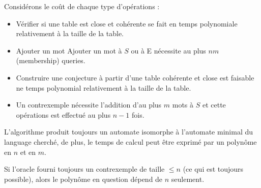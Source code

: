 Considérons le coût de chaque type d'opérations :
\begin{itemize}
	\item Vérifier si une table est close et cohérente se fait en temps polynomiale relativement à la taille de la table.
	\item Ajouter un mot  Ajouter un mot à $S$ ou à E nécessite au plus $nm$ (membership) queries.
	\item Construire une conjecture à partir d'une table cohérente et close est faisable ne temps polynomial relativement à
	      la taille de la table.
	\item Un contrexemple nécessite l'addition d'au plus $m$ mots à $S$ et cette opérations est effectué au plus $n-1$ fois.
\end{itemize}

\begin{theorem}
	L'algorithme produit toujours un automate isomorphe à l'automate minimal du language cherché, de plus, le temps de calcul peut être
	exprimé par un polynôme en $n$ et en $m$.
\end{theorem}

\begin{remarque}
	Si l'oracle fourni toujours un contrexemple de taille $\leq n$ (ce qui est toujours possible), alors le polynôme en question dépend de $n$ seulement.
\end{remarque}


